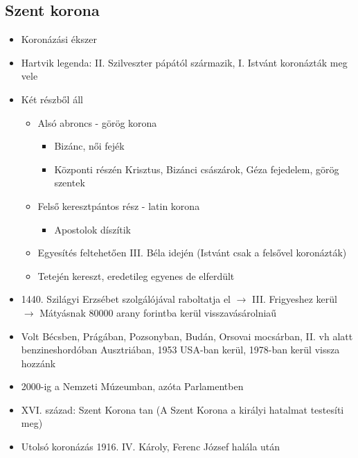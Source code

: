 \documentclass{article}
\begin{document}
\subsection{Szent korona}
\begin{itemize}
    \item Koronázási ékszer
    \item Hartvik legenda: II. Szilveszter pápától származik, I. Istvánt koronázták meg vele
    \item Két részből áll 
    \begin{itemize}
        \item Alsó abroncs - görög korona 
        \begin{itemize}
            \item Bizánc, női fejék
            \item Központi részén Krisztus, Bizánci császárok, Géza fejedelem, görög szentek
        \end{itemize}
        
        \item Felső keresztpántos rész - latin korona 
        \begin{itemize}
            \item Apostolok díszítik
        \end{itemize}
        
        \item Egyesítés feltehetően III. Béla idején (Istvánt csak a felsővel koronázták)
        \item Tetején kereszt, eredetileg egyenes de elferdült
    \end{itemize}
    
    \item 1440. Szilágyi Erzsébet szolgálójával raboltatja el $\rightarrow$ III. Frigyeshez kerül $\rightarrow$ Mátyásnak $80000$ arany forintba kerül visszavásárolniaű
    
    \item Volt Bécsben, Prágában, Pozsonyban, Budán, Orsovai mocsárban, II. vh alatt benzineshordóban Ausztriában, 1953 USA-ban kerül, 1978-ban kerül vissza hozzánk 
    
    \item 2000-ig a Nemzeti Múzeumban, azóta Parlamentben

    \item XVI. század: Szent Korona tan (A Szent Korona a királyi hatalmat testesíti meg)

    \item Utolsó koronázás 1916. IV. Károly, Ferenc József halála után

\end{itemize}
\end{document}
